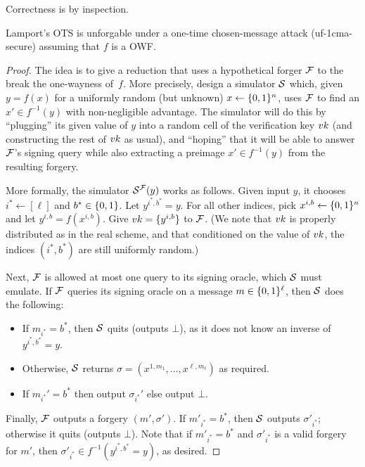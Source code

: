 \documentclass[11pt]{article}
\begin{document}
\noindent Correctness is by inspection.

\begin{theorem}
  \label{thm:ots-1cma}
  Lamport's OTS is unforgable under a one-time chosen-message attack
  (uf-1cma-secure) assuming that $f$ is a OWF.
\end{theorem}

\begin{proof}
  The idea is to give a reduction that uses a hypothetical forger
  $\mathcal{F}$ to the break the one-wayness of~$f$.  More precisely, design
  a simulator $\mathcal{S}$ which, given $y = f(x)$ for a uniformly random
  (but unknown) $x \gets \{0,1\}^{n}$, uses $\mathcal{F}$ to find an $x' \in
  f^{-1}(y)$ with non-negligible advantage.  The simulator will do
  this by ``plugging'' its given value of $y$ into a random cell of
  the verification key $vk$ (and constructing the rest of $vk$ as
  usual), and ``hoping'' that it will be able to answer $\mathcal{F}$'s
  signing query while also extracting a preimage $x' \in f^{-1}(y)$
  from the resulting forgery.

  More formally, the simulator $\mathcal{S}^{\mathcal{F}}(y)$ works as follows.
  Given input $y$, it chooses $i^* \gets [\ell]$ and $b^* \in \{0,1\}$.
  Let $y^{i^*,b^*} = y$.  For all other indices, pick $x^{i,b} \gets
  \{0,1\}^n$ and let $y^{i,b} = f(x^{i,b})$.  Give $vk = \{y^{i,b}\}$
  to $\mathcal{F}$.  (We note that $vk$ is properly distributed as in the
  real scheme, and that conditioned on the value of $vk$, the indices
  $(i^*,b^*)$ are still uniformly random.)

  Next, $\mathcal{F}$ is allowed at most one query to its signing oracle,
  which $\mathcal{S}$ must emulate.  If $\mathcal{F}$ queries its signing oracle on
  a message $m \in \{0,1\}^{\ell}$, then $\mathcal{S}$ does the following:
  \begin{itemize}
  \item If $m_{i^*} = b^*$, then $\mathcal{S}$ quits (outputs $\bot$), as it
    does not know an inverse of $y^{i^{*},b^{*}} = y$.
  \item Otherwise, $\mathcal{S}$ returns $\sigma = (x^{1,m_{1}}, \ldots,
    x^{\ell,m_{\ell}})$ as required.
  \item If $m_{i^*}' = b^*$ then output $\sigma_{i^*}'$ else output
    $\bot$.
  \end{itemize}

  Finally, $\mathcal{F}$ outputs a forgery $(m', \sigma')$.  If $m'_{i^{*}} =
  b^{*}$, then $\mathcal{S}$ outputs $\sigma'_{i^{*}}$; otherwise it quits
  (outputs $\bot$).  Note that if $m'_{i^{*}} = b^{*}$ and
  $\sigma'_{i^*}$ is a valid forgery for $m'$, then $\sigma'_{i^{*}}
  \in f^{-1}(y^{i^*,b^*} = y)$, as desired.


\end{proof}
\end{document}
